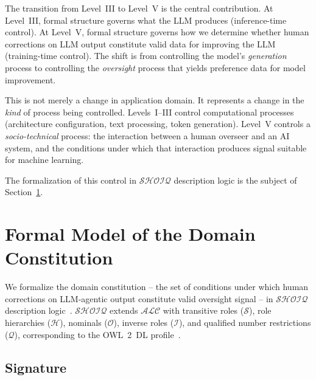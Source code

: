 \documentclass[11pt]{article}
\newcommand{\DL}{\ensuremath{\mathcal{SHOIQ}}\xspace}
\begin{document}
The transition from Level~III to Level~V is the central contribution.
At Level~III, formal structure governs what the LLM produces (inference-time control).
At Level~V, formal structure governs how we determine whether human corrections on LLM output constitute valid data for improving the LLM (training-time control).
The shift is from controlling the model's \emph{generation} process to controlling the \emph{oversight} process that yields preference data for model improvement.

This is not merely a change in application domain.
It represents a change in the \emph{kind} of process being controlled.
Levels~I--III control computational processes (architecture configuration, text processing, token generation).
Level~V controls a \emph{socio-technical} process: the interaction between a human overseer and an AI system, and the conditions under which that interaction produces signal suitable for machine learning.

The formalization of this control in \DL description logic is the subject of Section~\ref{sec:formal}.


\section{Formal Model of the Domain Constitution}
\label{sec:formal}

We formalize the domain constitution -- the set of conditions under which human corrections on LLM-agentic output constitute valid oversight signal -- in \DL description logic~\citep{baader2003description}.
\DL extends $\mathcal{ALC}$ with transitive roles ($\mathcal{S}$), role hierarchies ($\mathcal{H}$), nominals ($\mathcal{O}$), inverse roles ($\mathcal{I}$), and qualified number restrictions ($\mathcal{Q}$), corresponding to the OWL~2~DL profile~\citep{grau2008owl2}.

\subsection{Signature}
\label{sec:signature}
\end{document}
